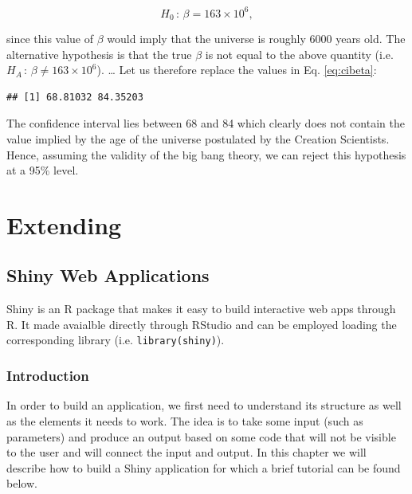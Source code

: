 \documentclass[12pt,]{krantz}
\newenvironment{Shaded}{\begin{snugshade}}{\end{snugshade}}
\newcommand{\CommentTok}[1]{\textcolor[rgb]{0.37,0.37,0.37}{\textit{#1}}}
\newcommand{\OperatorTok}[1]{\textcolor[rgb]{0.43,0.43,0.43}{\textbf{#1}}}
\newcommand{\NormalTok}[1]{#1}
\begin{document}
\begin{equation*}
  H_0 \, : \, \beta = 163 \times 10^6 ,
\end{equation*}

since this value of \(\beta\) would imply that the universe is roughly
6000 years old. The alternative hypothesis is that the true \(\beta\) is
not equal to the above quantity (i.e.
\(H_A \, : \, \beta \neq 163 \times 10^6\)). \ldots{} Let us therefore
replace the values in Eq. \eqref{eq:cibeta}:

\begin{Shaded}
\end{Shaded}

\begin{verbatim}
## [1] 68.81032 84.35203
\end{verbatim}

The confidence interval lies between 68 and 84 which clearly does not
contain the value implied by the age of the universe postulated by the
Creation Scientists. Hence, assuming the validity of the big bang
theory, we can reject this hypothesis at a 95\% level.

\part{Extending}\label{part-extending}

\chapter{Shiny Web Applications}\label{shiny-web-applications}

Shiny is an R package that makes it easy to build interactive web apps
through R. It made avaialble directly through RStudio and can be
employed loading the corresponding library (i.e.
\texttt{library(shiny)}).

\section{Introduction}\label{introduction-3}

In order to build an application, we first need to understand its
structure as well as the elements it needs to work. The idea is to take
some input (such as parameters) and produce an output based on some code
that will not be visible to the user and will connect the input and
output. In this chapter we will describe how to build a Shiny
application for which a brief tutorial can be found below.
\end{document}
